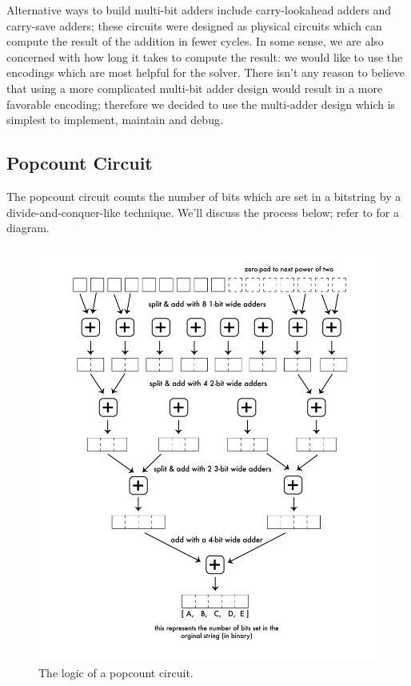 Alternative ways to build multi-bit adders include carry-lookahead adders and carry-save adders; these circuits were designed as physical circuits which can compute the result of the addition in fewer cycles. In some sense, we are also concerned with how long it takes to compute the result: we would like to use the encodings which are most helpful for the solver. There isn't any reason to believe that using a more complicated multi-bit adder design would result in a more favorable encoding; therefore we decided to use the multi-adder design which is simplest to implement, maintain and debug.

\subsection{Popcount Circuit}

The popcount circuit counts the number of bits which are set in a bitstring by a divide-and-conquer-like technique. We'll discuss the process below; refer to  for a diagram.

\begin{figure}[t]
    \centerline{\includegraphics[origin=c,width=12cm]{fig_popcount}}
    \caption{The logic of a popcount circuit.}%
    \label{fig:popcount}%
\end{figure}

